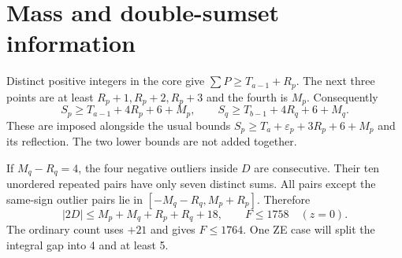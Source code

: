 \documentclass[11pt,a4paper]{article}
\begin{document}
\section{Mass and double-sumset information}
Distinct positive integers in the core give
$\sum P\ge T_{a-1}+R_p$. The next three points are at least
$R_p+1,R_p+2,R_p+3$ and the fourth is $M_p$. Consequently
\begin{equation}\label{eq:mass}
 S_p\ge T_{a-1}+4R_p+6+M_p,
 \qquad S_q\ge T_{b-1}+4R_q+6+M_q.
\end{equation}
These are imposed alongside the usual bounds
$S_p\ge T_a+\varepsilon_p+3R_p+6+M_p$ and its reflection.
The two lower bounds are not added together.

If $M_q-R_q=4$, the four negative outliers inside $D$ are consecutive.
Their ten unordered repeated pairs have only seven distinct sums.
All pairs except the same-sign outlier pairs lie in
$[-M_q-R_q,M_p+R_p]$. Therefore
\begin{equation}\label{eq:gap4}
 |2D|\le M_p+M_q+R_p+R_q+18,
 \qquad F\le1758\quad(z=0).
\end{equation}
The ordinary count uses $+21$ and gives $F\le1764$.
One ZE case will split the integral gap into 4 and at least 5.
\end{document}
